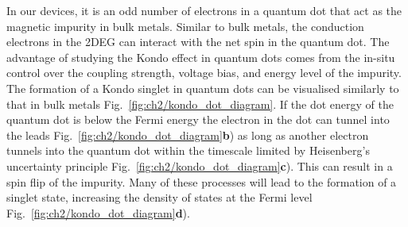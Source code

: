 In our devices, it is an odd number of electrons in a quantum dot that act as the magnetic impurity in bulk metals. Similar to bulk metals, the conduction electrons in the 2DEG can interact with the net spin in the quantum dot. The advantage of studying the Kondo effect in quantum dots comes from the in-situ control over the coupling strength, voltage bias, and energy level of the impurity.
 The formation of a Kondo singlet in quantum dots can be visualised similarly to that in bulk metals Fig.~\ref{fig:ch2/kondo_dot_diagram}. If the dot energy of the quantum dot is below the Fermi energy the electron in the dot can tunnel into the leads Fig.~\ref{fig:ch2/kondo_dot_diagram}\textbf{b}) as long as another electron tunnels into the quantum dot within the timescale limited by Heisenberg’s uncertainty principle Fig.~\ref{fig:ch2/kondo_dot_diagram}\textbf{c}). This can result in a spin flip of the impurity. Many of these processes will lead to the formation of a singlet state, increasing the density of states at the Fermi level Fig.~\ref{fig:ch2/kondo_dot_diagram}\textbf{d}). 

